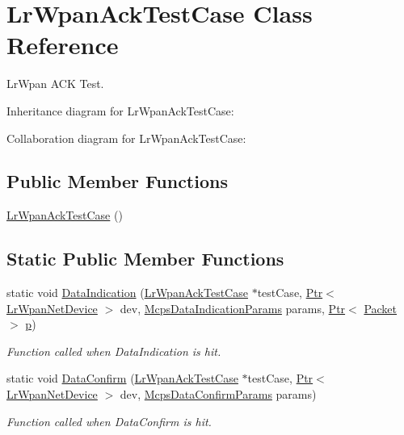 \hypertarget{classLrWpanAckTestCase}{}\section{Lr\+Wpan\+Ack\+Test\+Case Class Reference}
\label{classLrWpanAckTestCase}


Lr\+Wpan A\+CK Test.  




Inheritance diagram for Lr\+Wpan\+Ack\+Test\+Case\+:


Collaboration diagram for Lr\+Wpan\+Ack\+Test\+Case\+:
\subsection*{Public Member Functions}
\begin{DoxyCompactItemize}
\item 
\hyperlink{classLrWpanAckTestCase_aea03fbb46c4d61a8f01feebe7b811672}{Lr\+Wpan\+Ack\+Test\+Case} ()
\end{DoxyCompactItemize}
\subsection*{Static Public Member Functions}
\begin{DoxyCompactItemize}
\item 
static void \hyperlink{classLrWpanAckTestCase_a909c2c084312c564fbf2b8a4a2b1ec3b}{Data\+Indication} (\hyperlink{classLrWpanAckTestCase}{Lr\+Wpan\+Ack\+Test\+Case} $\ast$test\+Case, \hyperlink{classns3_1_1Ptr}{Ptr}$<$ \hyperlink{classns3_1_1LrWpanNetDevice}{Lr\+Wpan\+Net\+Device} $>$ dev, \hyperlink{structns3_1_1McpsDataIndicationParams}{Mcps\+Data\+Indication\+Params} params, \hyperlink{classns3_1_1Ptr}{Ptr}$<$ \hyperlink{classns3_1_1Packet}{Packet} $>$ \hyperlink{lte__link__budget__x2__handover__measures_8m_ac9de518908a968428863f829398a4e62}{p})
\begin{DoxyCompactList}\small\item\em Function called when Data\+Indication is hit. \end{DoxyCompactList}\item 
static void \hyperlink{classLrWpanAckTestCase_a47e37262c04ab7ae2074a337516e34aa}{Data\+Confirm} (\hyperlink{classLrWpanAckTestCase}{Lr\+Wpan\+Ack\+Test\+Case} $\ast$test\+Case, \hyperlink{classns3_1_1Ptr}{Ptr}$<$ \hyperlink{classns3_1_1LrWpanNetDevice}{Lr\+Wpan\+Net\+Device} $>$ dev, \hyperlink{structns3_1_1McpsDataConfirmParams}{Mcps\+Data\+Confirm\+Params} params)
\begin{DoxyCompactList}\small\item\em Function called when Data\+Confirm is hit. \end{DoxyCompactList}\end{DoxyCompactItemize}
